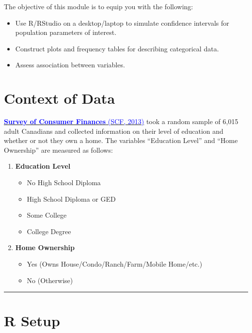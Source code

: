 \documentclass[oneside,openany]{book}
\begin{document}
The objective of this module is to equip you with the following:

\begin{itemize}
    \item Use R/RStudio on a desktop/laptop to simulate confidence intervals for population parameters of interest.
    \item Construct plots and frequency tables for describing categorical data.
    \item Assess association between variables.
\end{itemize}


\section{Context of Data}\label{context-of-data}

\href{https://www23.statcan.gc.ca/imdb/p2SV.pl?Function=getSurvey&SDDS=3502}{\textcolor{blue}{\textbf{Survey of Consumer Finances} (SCF, 2013)}}
 took a random sample of 6,015 adult Canadians and collected information on their level of education and whether or not they own a home. The variables ``Education Level'' and ``Home Ownership'' are measured as follows:

\begin{enumerate}
    \item \textbf{Education Level}
    \begin{itemize}
        \item No High School Diploma
        \item High School Diploma or GED
        \item Some College
        \item College Degree
    \end{itemize}
    \item \textbf{Home Ownership}
    \begin{itemize}
        \item Yes (Owns House/Condo/Ranch/Farm/Mobile Home/etc.)
        \item No (Otherwise)
    \end{itemize}
\end{enumerate}


\begin{center}\rule{0.5\linewidth}{0.5pt}\end{center}

\section{R Setup}\label{r-setup}
\end{document}
